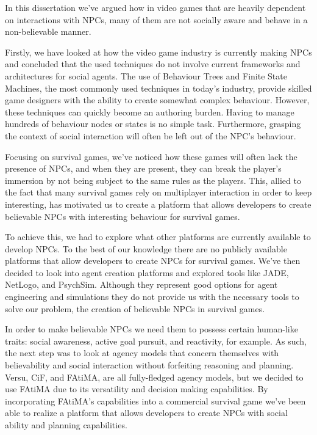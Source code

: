 \cleardoublepage
\label{chapter:conclusion}

\noindent In this dissertation we've argued how in video games that are heavily dependent on interactions with \acp{NPC}, many of them are not socially aware and behave in a non-believable manner.

Firstly, we have looked at how the video game industry is currently making \acp{NPC} and concluded that the used techniques do not involve current frameworks and architectures for social agents.
The use of Behaviour Trees and Finite State Machines, the most commonly used techniques in today's industry, provide skilled game designers with the ability to create somewhat complex behaviour.
However, these techniques can quickly become an authoring burden.
Having to manage hundreds of behaviour nodes or states is no simple task.
Furthermore, grasping the context of social interaction will often be left out of the \ac{NPC}'s behaviour.

Focusing on survival games, we've noticed how these games will often lack the presence of \acp{NPC}, and when they are present, they can break the player's immersion by not being subject to the same rules as the players.
This, allied to the fact that many survival games rely on multiplayer interaction in order to keep interesting, has motivated us to create a platform that allows developers to create believable \acp{NPC} with interesting behaviour for survival games.

To achieve this, we had to explore what other platforms are currently available to develop \acp{NPC}. To the best of our knowledge there are no publicly available platforms that allow developers to create \acp{NPC} for survival games.
We've then decided to look into agent creation platforms and explored tools like \ac{JADE}, NetLogo, and PsychSim.
Although they represent good options for agent engineering and simulations they do not provide us with the necessary tools to solve our problem, the creation of believable \acp{NPC} in survival games.

In order to make believable \acp{NPC} we need them to possess certain human-like traits: social awareness, active goal pursuit, and reactivity, for example.
As such, the next step was to look at agency models that concern themselves with believability and social interaction without forfeiting reasoning and planning.
Versu, \ac{CiF}, and \ac{FAtiMA}, are all fully-fledged agency models, but we decided to use \ac{FAtiMA} due to its versatility and decision making capabilities.
By incorporating \ac{FAtiMA}'s capabilities into a commercial survival game we've been able to realize a platform that allows developers to create \acp{NPC} with social ability and planning capabilities.


